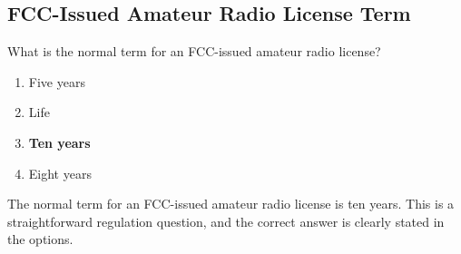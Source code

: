 \subsection{FCC-Issued Amateur Radio License Term}
\label{T1C08}

\begin{tcolorbox}[colback=gray!10!white,colframe=black!75!black,title=T1C08]
What is the normal term for an FCC-issued amateur radio license?
\begin{enumerate}[label=\Alph*,noitemsep]
    \item Five years
    \item Life
    \item \textbf{Ten years}
    \item Eight years
\end{enumerate}
\end{tcolorbox}

The normal term for an FCC-issued amateur radio license is ten years. This is a straightforward regulation question, and the correct answer is clearly stated in the options.